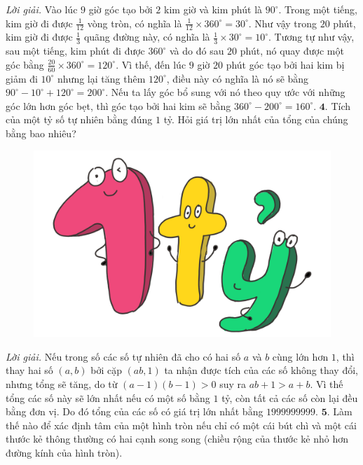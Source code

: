 \begin{multicols}{2}
\begin{figure}[H]
			\vspace*{-15pt}
		\end{figure}
	\textit{Lời giải.} 	Vào lúc $9$ giờ góc tạo bởi $2$ kim giờ và kim phút là $90^\circ$. Trong một tiếng, kim giờ đi được $\frac{1}{12}$ vòng tròn, có nghĩa là $\frac{1}{12}\times 360^\circ = 30^\circ$. Như vậy trong $20$ phút, kim giờ đi được $\frac{1}{3}$ quãng đường này, có nghĩa là $\frac{1}{3}\times 30^\circ=10^\circ$. Tương tự như vậy, sau một tiếng, kim phút đi được $360^\circ$ và do đó sau $20$ phút, nó quay được một góc bằng $\frac{20}{60}\times 360^\circ=120^\circ$. Vì thế, đến lúc $9$ giờ $20$ phút góc tạo bởi hai kim bị giảm đi $10^\circ$ nhưng lại tăng thêm $120^\circ$, điều này có nghĩa là nó sẽ bằng $90^\circ-10^\circ+120^\circ=200^\circ$. Nếu ta lấy góc bổ sung với nó theo quy ước với những góc lớn hơn góc bẹt, thì góc tạo bởi hai kim sẽ bằng $360^\circ-200^\circ=160^\circ$.
	\vskip 0.1cm
	$\pmb{4.}$ Tích của một tỷ số tự nhiên bằng đúng $1$ tỷ. Hỏi giá trị lớn nhất của tổng của chúng bằng bao nhiêu?
	\begin{figure}[H]
			\centering
			\vspace*{-10pt}
			\captionsetup{labelformat= empty, justification=centering}
			\includegraphics[width=0.8\linewidth]{bai5}
			\vspace*{-10pt}
		\end{figure}
	\textit{Lời giải.} 	Nếu trong số các số tự nhiên đã cho có hai số $a$ và $b$ cùng lớn hơn $1$, thì thay hai số $(a,b)$ bởi cặp $(ab,1)$ ta nhận được tích của các số không thay đổi, nhưng tổng  sẽ tăng, do từ $(a-1)(b-1) >0$ suy ra $ab+1 > a+b$. Vì thế tổng các số này sẽ lớn nhất nếu có một số bằng $1$ tỷ, còn tất cả các số còn lại đều bằng đơn vị. Do đó tổng của các số có giá trị lớn nhất bằng $1 999 999 999$.
	\vskip 0.1cm
	$\pmb{5.}$ Làm thế nào để xác định tâm của một hình tròn nếu chỉ có một cái bút chì và một cái thước kẻ thông thường có hai cạnh song song (chiều rộng của thước kẻ nhỏ hơn đường kính của hình tròn).

\end{multicols}
